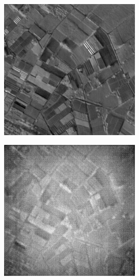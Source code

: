 \documentclass[10pt,twocolumn,letterpaper]{article}
\begin{document}
\begin{figure}[!ht]
  \centering
  \begin{subfigure}[b]{0.19\textwidth}
      \centering
      \includegraphics[width=\textwidth]{../figs/outputs/pan/50.png}
  \end{subfigure}
  \hfill
  \begin{subfigure}[b]{0.19\textwidth}
      \centering
      \includegraphics[width=\textwidth]{../figs/outputs/cycleGan/50.png}

\end{subfigure}
\end{figure}
\end{document}

